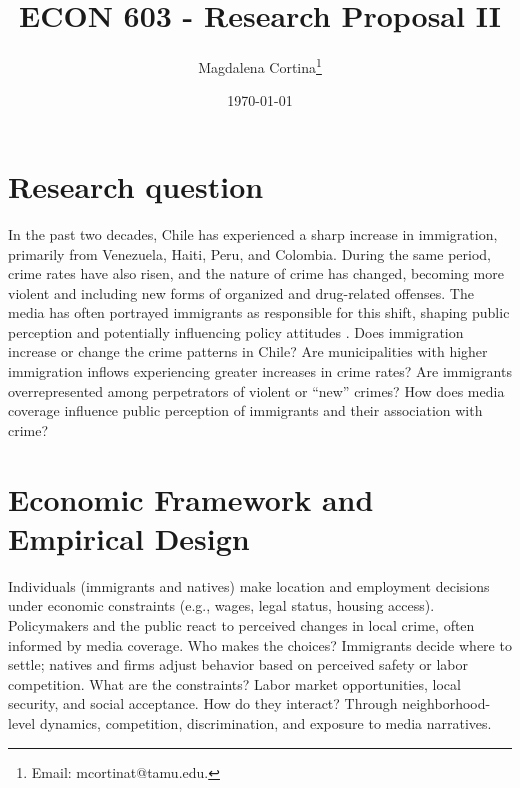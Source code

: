 




\title{\Large \textbf{ECON 603 - Research Proposal II}}

\author{Magdalena Cortina\thanks{Email: mcortinat@tamu.edu.}} 
\date{\today}

\maketitle
\thispagestyle{empty} 
\doublespacing
\thispagestyle{empty} 

\vspace{-10mm}

\doublespacing

\section{ Research question}

In the past two decades, Chile has experienced a sharp increase in immigration, primarily from Venezuela, Haiti, Peru, and Colombia. During the same period, crime rates have also risen, and the nature of crime has changed, becoming more violent and including new forms of organized and drug-related offenses. The media has often portrayed immigrants as responsible for this shift, shaping public perception and potentially influencing policy attitudes \citep{valenzuela2019media}. Does immigration increase or change the crime patterns in Chile? Are municipalities with higher immigration inflows experiencing greater increases in crime rates? Are immigrants overrepresented among perpetrators of violent or “new” crimes? How does media coverage influence public perception of immigrants and their association with crime?

\section{ Economic Framework and Empirical Design}

Individuals (immigrants and natives) make location and employment decisions under economic constraints (e.g., wages, legal status, housing access). Policymakers and the public react to perceived changes in local crime, often informed by media coverage. 
Who makes the choices? Immigrants decide where to settle; natives and firms adjust behavior based on perceived safety or labor competition.
What are the constraints? Labor market opportunities, local security, and social acceptance.
How do they interact? Through neighborhood-level dynamics, competition, discrimination, and exposure to media narratives.

